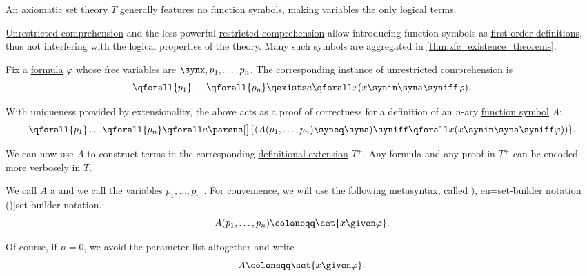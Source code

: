 \begin{definition}\label{def:set_theory_definition}
  An \hyperref[def:axiomatic_set_theory]{axiomatic set theory} \( T \) generally features no \hyperref[def:fol_signature/function]{function symbols}, making variables the only \hyperref[def:fol_term]{logical terms}.

  \hyperref[def:naive_set_theory/comprehension]{Unrestricted comprehension} and the less powerful \hyperref[def:zfc/comprehension]{restricted comprehension} allow introducing function symbols as \hyperref[def:fol_definition/function]{first-order definitions}, thus not interfering with the logical properties of the theory. Many such symbols are aggregated in \cref{thm:zfc_existence_theorems}.

  Fix a \hyperref[def:fol_formula]{formula} \( \varphi \) whose free variables are \( \synx, p_1, \ldots, p_n \). The corresponding instance of unrestricted comprehension is
  \begin{equation*}
    \qforall {p_1} \ldots \qforall {p_n} \qexists a \qforall x (x \synin \syna \syniff \varphi).
  \end{equation*}

  With uniqueness provided by extensionality, the above acts as a proof of correctness for a definition of an \( n \)-ary \hyperref[def:fol_signature/function]{function symbol} \( A \):
  \begin{equation*}
    \qforall {p_1} \ldots \qforall {p_n} \qforall a \parens[\big]{ (A(p_1, \ldots, p_n) \syneq \syna) \syniff \qforall x (x \synin \syna \syniff \varphi)) }.
  \end{equation*}

  We can now use \( A \) to construct terms in the corresponding \hyperref[def:fol_definitional_extension]{definitional extension} \( T^+ \). Any formula and any proof in \( T^+ \) can be encoded more verbosely in \( T \).

  We call \( A \) a  and we call the variables \( p_1, \ldots, p_n \) . For convenience, we will use the following metasyntax, called \term[ru=определение множества выделением (\cite[133]{КолмогоровДрагалин2006ЛогикаДополнительныеГлавы}), en=set-builder notation (\cite[10]{CitkinMuravitsky2022ConsequenceRelations})]{set-builder notation}.:
  \begin{equation*}
    A(p_1, \ldots, p_n) \coloneqq \set{ x \given \varphi }.
  \end{equation*}

  Of course, if \( n = 0 \), we avoid the parameter list altogether and write
  \begin{equation*}
    A \coloneqq \set{ x \given \varphi }.
  \end{equation*}


\end{definition}
